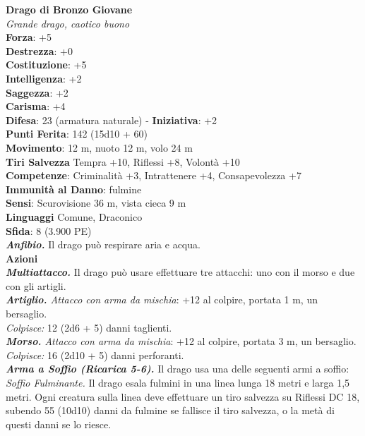 \begin{multicols}{2}
\medskip\textbf{Drago di Bronzo Giovane}\\
\emph{Grande drago, caotico buono}\\
\textbf{Forza}: +5\\
\textbf{Destrezza}: +0\\
\textbf{Costituzione}: +5\\
\textbf{Intelligenza}: +2\\
\textbf{Saggezza}: +2\\
\textbf{Carisma}: +4\\
\textbf{Difesa}: 23 (armatura naturale) - \textbf{Iniziativa}: +2\\
\textbf{Punti Ferita}: 142 (15d10 + 60)\\
\textbf{Movimento}: 12 m, nuoto 12 m, volo 24 m\\
\textbf{Tiri Salvezza} Tempra +10, Riflessi +8, Volontà +10\\
\textbf{Competenze}: Criminalità +3, Intrattenere +4, Consapevolezza +7\\
\textbf{Immunità al Danno}: fulmine\\
\textbf{Sensi}: Scurovisione 36 m, vista cieca 9 m\\
\textbf{Linguaggi} Comune, Draconico\\
\textbf{Sfida}: 8 (3.900 PE)\smallskip\\
\emph{\textbf{Anfibio.}} Il drago può respirare aria e acqua.\\
\smallskip\textbf{Azioni}\\
\emph{\textbf{Multiattacco.}} Il drago può usare effettuare tre attacchi: uno con il morso e due con gli artigli.\\
\emph{\textbf{Artiglio.} Attacco con arma da mischia}: +12 al colpire, portata 1 m, un bersaglio.\\
\emph{Colpisce:} 12 (2d6 + 5) danni taglienti.\\
\emph{\textbf{Morso.} Attacco con arma da mischia}: +12 al colpire, portata 3 m, un bersaglio.\\
\emph{Colpisce:} 16 (2d10 + 5) danni perforanti.\\
\emph{\textbf{Arma a Soffio (Ricarica 5-6).}} Il drago usa una delle seguenti armi a soffio:\\
\emph{Soffio Fulminante.} Il drago esala fulmini in una linea lunga 18 metri e larga 1,5 metri. Ogni creatura sulla linea deve effettuare un tiro salvezza su Riflessi DC  18, subendo 55 (10d10) danni da fulmine se fallisce il tiro salvezza, o la metà di questi danni se lo riesce.\\

\end{multicols}
